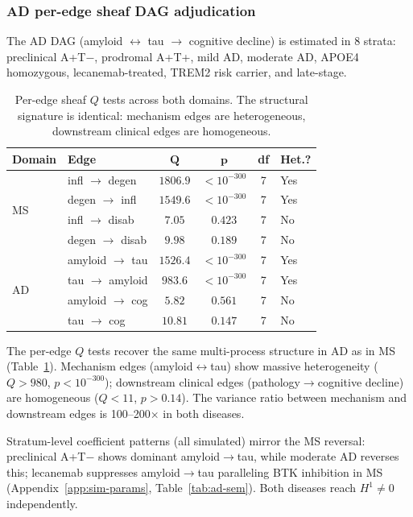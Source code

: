 \documentclass{article}
\begin{document}
\subsubsection{AD per-edge sheaf DAG adjudication}

The AD DAG (amyloid $\leftrightarrow$ tau $\to$ cognitive decline) is estimated in 8 strata: preclinical A+T$-$, prodromal A+T+, mild AD, moderate AD, APOE4 homozygous, lecanemab-treated, TREM2 risk carrier, and late-stage.

\begin{table}[t]
\centering
\caption{Per-edge sheaf $Q$ tests across both domains. The structural signature is identical: mechanism edges are heterogeneous, downstream clinical edges are homogeneous.}
\label{tab:dag-cross}
\small
\begin{tabular}{@{}llcccl@{}}
\toprule
\textbf{Domain} & \textbf{Edge} & $\boldsymbol{Q}$ & $\boldsymbol{p}$ & \textbf{df} & \textbf{Het.?} \\
\midrule
\multirow{4}{*}{MS} & infl $\to$ degen & $1806.9$ & $< 10^{-300}$ & 7 & Yes \\
& degen $\to$ infl & $1549.6$ & $< 10^{-300}$ & 7 & Yes \\
& infl $\to$ disab & $7.05$ & $0.423$ & 7 & No \\
& degen $\to$ disab & $9.98$ & $0.189$ & 7 & No \\
\midrule
\multirow{4}{*}{AD} & amyloid $\to$ tau & $1526.4$ & $< 10^{-300}$ & 7 & Yes \\
& tau $\to$ amyloid & $983.6$ & $< 10^{-300}$ & 7 & Yes \\
& amyloid $\to$ cog & $5.82$ & $0.561$ & 7 & No \\
& tau $\to$ cog & $10.81$ & $0.147$ & 7 & No \\
\bottomrule
\end{tabular}
\end{table}

The per-edge $Q$ tests recover the same multi-process structure in AD as in MS (Table~\ref{tab:dag-cross}).
Mechanism edges (amyloid$\leftrightarrow$tau) show massive heterogeneity ($Q > 980$, $p < 10^{-300}$); downstream clinical edges (pathology$\to$cognitive decline) are homogeneous ($Q < 11$, $p > 0.14$).
The variance ratio between mechanism and downstream edges is 100--200$\times$ in both diseases.

Stratum-level coefficient patterns (all simulated) mirror the MS reversal: preclinical A+T$-$ shows dominant amyloid$\to$tau, while moderate AD reverses this; lecanemab suppresses amyloid$\to$tau paralleling BTK inhibition in MS (Appendix~\ref{app:sim-params}, Table~\ref{tab:ad-sem}).
Both diseases reach $H^1 \neq 0$ independently.
\end{document}
